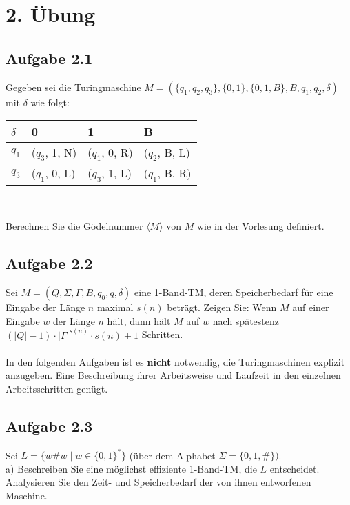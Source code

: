\section*{2. Übung}
\subsection*{Aufgabe 2.1}
Gegeben sei die Turingmaschine $M=(\{q_1, q_2, q_3\}, \{0,1\}, \{0,1,B\}, B, q_1, q_2, \delta)$ mit $\delta$ wie folgt:
\begin{center}
	\begin{tabular}{l|lll}
		$\delta$ & \hspace{0.6cm}0 & \hspace{0.6cm}1 & \hspace{0.6cm}B \\ \hline
		$q_1$ & ($q_3$, 1, N) & ($q_1$, 0, R) & ($q_2$, B, L) \\
		$q_3$ & ($q_1$, 0, L) & ($q_3$, 1, L) & ($q_1$, B, R)
	\end{tabular}\\
\end{center}
Berechnen Sie die Gödelnummer $\langle M \rangle$ von $M$ wie in der Vorlesung definiert.

\subsection*{Aufgabe 2.2}
Sei $M = (Q, \Sigma, \Gamma, B, q_0, \bar{q}, \delta)$ eine 1-Band-TM, deren Speicherbedarf für eine Eingabe der Länge $n$ maximal $s(n)$ beträgt. Zeigen Sie: Wenn $M$ auf einer Eingabe $w$ der Länge $n$ hält, dann hält $M$ auf $w$ nach spätestenz $(\left| Q\right| -1) \cdot \left| \Gamma\right|^{s(n)} \cdot s(n)+1$ Schritten.\\\\

In den folgenden Aufgaben ist es \textbf{nicht} notwendig, die Turingmaschinen explizit anzugeben. Eine Beschreibung ihrer Arbeitsweise und Laufzeit in den einzelnen Arbeitsschritten genügt.

\subsection*{Aufgabe 2.3}
Sei $L=\{w\#w \mid w \in \{0,1\}^*\}$ (über dem Alphabet $\Sigma = \{0,1,\#\})$.\\
a) Beschreiben Sie eine möglichst effiziente 1-Band-TM, die $L$ entscheidet. Analysieren Sie den Zeit- und Speicherbedarf der von ihnen entworfenen Maschine.\\

